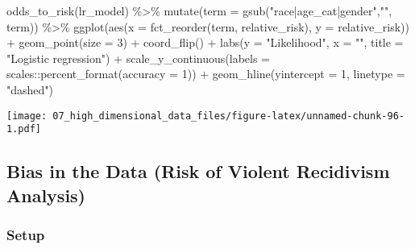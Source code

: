 \documentclass[
]{book}
\newenvironment{Shaded}{\begin{snugshade}}{\end{snugshade}}
\newcommand{\AttributeTok}[1]{\textcolor[rgb]{0.77,0.63,0.00}{#1}}
\newcommand{\DecValTok}[1]{\textcolor[rgb]{0.00,0.00,0.81}{#1}}
\newcommand{\FunctionTok}[1]{\textcolor[rgb]{0.00,0.00,0.00}{#1}}
\newcommand{\NormalTok}[1]{#1}
\newcommand{\SpecialCharTok}[1]{\textcolor[rgb]{0.00,0.00,0.00}{#1}}
\newcommand{\StringTok}[1]{\textcolor[rgb]{0.31,0.60,0.02}{#1}}
\begin{document}
\begin{Shaded}
\begin{Highlighting}[]
\FunctionTok{odds\_to\_risk}\NormalTok{(lr\_model) }\SpecialCharTok{\%\textgreater{}\%}
    \FunctionTok{mutate}\NormalTok{(}\AttributeTok{term =} \FunctionTok{gsub}\NormalTok{(}\StringTok{"race|age\_cat|gender"}\NormalTok{,}\StringTok{""}\NormalTok{, term)) }\SpecialCharTok{\%\textgreater{}\%} 
    \FunctionTok{ggplot}\NormalTok{(}\FunctionTok{aes}\NormalTok{(}\AttributeTok{x =} \FunctionTok{fct\_reorder}\NormalTok{(term, relative\_risk), }\AttributeTok{y =}\NormalTok{ relative\_risk)) }\SpecialCharTok{+}
        \FunctionTok{geom\_point}\NormalTok{(}\AttributeTok{size =} \DecValTok{3}\NormalTok{) }\SpecialCharTok{+}
        \FunctionTok{coord\_flip}\NormalTok{() }\SpecialCharTok{+}
        \FunctionTok{labs}\NormalTok{(}\AttributeTok{y =} \StringTok{"Likelihood"}\NormalTok{, }\AttributeTok{x =} \StringTok{""}\NormalTok{,}
             \AttributeTok{title =} \StringTok{"Logistic regression"}\NormalTok{) }\SpecialCharTok{+}
        \FunctionTok{scale\_y\_continuous}\NormalTok{(}\AttributeTok{labels =}\NormalTok{ scales}\SpecialCharTok{::}\FunctionTok{percent\_format}\NormalTok{(}\AttributeTok{accuracy =} \DecValTok{1}\NormalTok{)) }\SpecialCharTok{+}
        \FunctionTok{geom\_hline}\NormalTok{(}\AttributeTok{yintercept =} \DecValTok{1}\NormalTok{, }\AttributeTok{linetype =} \StringTok{"dashed"}\NormalTok{)}
\end{Highlighting}
\end{Shaded}

\texttt{[image: 07\_high\_dimensional\_data\_files/figure-latex/unnamed-chunk-96-1.pdf]}

\hypertarget{bias-in-the-data-risk-of-violent-recidivism-analysis}{%
\subsection{Bias in the Data (Risk of Violent Recidivism Analysis)}\label{bias-in-the-data-risk-of-violent-recidivism-analysis}}

\hypertarget{setup-8}{%
\subsubsection{Setup}\label{setup-8}}
\end{document}
